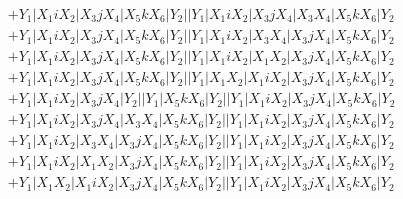 \documentclass{article}[12pt]
\begin{document}
\begin{align*}
 & +Y_1|X_1iX_2|X_3jX_4|X_5kX_6|Y_2||Y_1|X_1iX_2|X_3jX_4|X_3X_4|X_5kX_6|Y_2\\ 
 & +Y_1|X_1iX_2|X_3jX_4|X_5kX_6|Y_2||Y_1|X_1iX_2|X_3X_4|X_3jX_4|X_5kX_6|Y_2\\ 
 & +Y_1|X_1iX_2|X_3jX_4|X_5kX_6|Y_2||Y_1|X_1iX_2|X_1X_2|X_3jX_4|X_5kX_6|Y_2\\ 
 & +Y_1|X_1iX_2|X_3jX_4|X_5kX_6|Y_2||Y_1|X_1X_2|X_1iX_2|X_3jX_4|X_5kX_6|Y_2\\ 
 & +Y_1|X_1iX_2|X_3jX_4|Y_2||Y_1|X_5kX_6|Y_2||Y_1|X_1iX_2|X_3jX_4|X_5kX_6|Y_2\\ 
 & +Y_1|X_1iX_2|X_3jX_4|X_3X_4|X_5kX_6|Y_2||Y_1|X_1iX_2|X_3jX_4|X_5kX_6|Y_2\\ 
 & +Y_1|X_1iX_2|X_3X_4|X_3jX_4|X_5kX_6|Y_2||Y_1|X_1iX_2|X_3jX_4|X_5kX_6|Y_2\\ 
 & +Y_1|X_1iX_2|X_1X_2|X_3jX_4|X_5kX_6|Y_2||Y_1|X_1iX_2|X_3jX_4|X_5kX_6|Y_2\\ 
 & +Y_1|X_1X_2|X_1iX_2|X_3jX_4|X_5kX_6|Y_2||Y_1|X_1iX_2|X_3jX_4|X_5kX_6|Y_2\end{align*}
\end{document}
